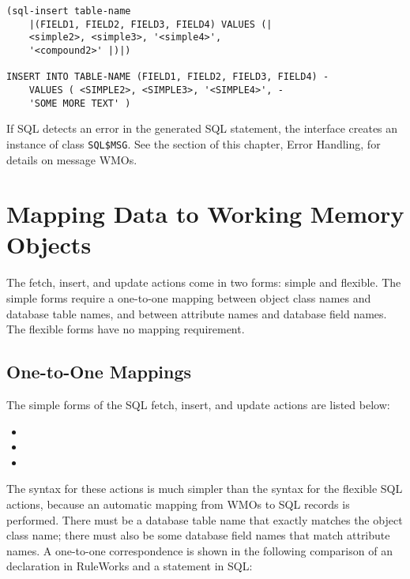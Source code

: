 \begin{exampl}
\begin{verbatim}
(sql-insert table-name
    |(FIELD1, FIELD2, FIELD3, FIELD4) VALUES (|
    <simple2>, <simple3>, '<simple4>',
    '<compound2>' |)|)

INSERT INTO TABLE-NAME (FIELD1, FIELD2, FIELD3, FIELD4) -
    VALUES ( <SIMPLE2>, <SIMPLE3>, '<SIMPLE4>', -
    'SOME MORE TEXT' )
\end{verbatim}
\end{exampl}

If SQL detects an error in the generated SQL statement, the interface
creates an instance of class
\verb|SQL$MSG|. See the section of this chapter, Error Handling, for
details on message WMOs.

\section{Mapping Data to Working Memory Objects}

The fetch, insert, and update actions come in two forms: simple and
flexible. The simple forms require a one-to-one mapping between object
class names and database table names, and between attribute names and
database field names. The flexible forms have no mapping requirement.

\subsection{One-to-One Mappings}

The simple forms of the SQL fetch, insert, and update actions are
listed below:

\begin{itemize}
\item {}
\item {}
\item {}
\end{itemize}

The syntax for these actions is much simpler than the syntax for the
flexible SQL actions, because an automatic mapping from WMOs to SQL
records is performed. There must be a database table name that exactly
matches the object class name; there must also be some database field
names that match attribute names. A one-to-one correspondence is shown
in the following comparison of an  declaration in
RuleWorks and a  statement in SQL:

